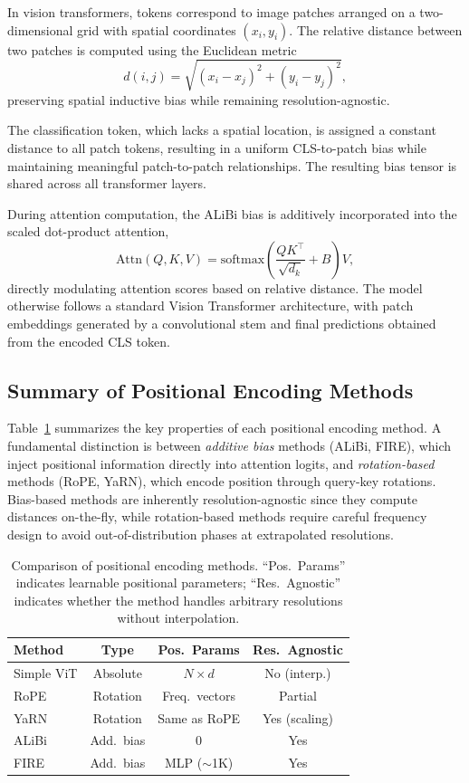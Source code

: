 In vision transformers, tokens correspond to image patches arranged on a two-dimensional grid with spatial coordinates $(x_i, y_i)$. The relative distance between two patches is computed using the Euclidean metric
\[
d(i, j) = \sqrt{(x_i - x_j)^2 + (y_i - y_j)^2},
\]
preserving spatial inductive bias while remaining resolution-agnostic.

The classification token, which lacks a spatial location, is assigned a constant distance to all patch tokens, resulting in a uniform CLS-to-patch bias while maintaining meaningful patch-to-patch relationships. The resulting bias tensor is shared across all transformer layers.

During attention computation, the ALiBi bias is additively incorporated into the scaled dot-product attention,
\[
\text{Attn}(Q, K, V) =
\text{softmax}\left(\frac{QK^\top}{\sqrt{d_k}} + B\right)V,
\]
directly modulating attention scores based on relative distance. The model otherwise follows a standard Vision Transformer architecture, with patch embeddings generated by a convolutional stem and final predictions obtained from the encoded CLS token.

\subsection{Summary of Positional Encoding Methods}

Table~\ref{tab:method_comparison} summarizes the key properties of each positional encoding method. A fundamental distinction is between \emph{additive bias} methods (ALiBi, FIRE), which inject positional information directly into attention logits, and \emph{rotation-based} methods (RoPE, YaRN), which encode position through query-key rotations. Bias-based methods are inherently resolution-agnostic since they compute distances on-the-fly, while rotation-based methods require careful frequency design to avoid out-of-distribution phases at extrapolated resolutions.

\begin{table}[t]
\centering
\caption{Comparison of positional encoding methods. ``Pos.\ Params'' indicates learnable positional parameters; ``Res.\ Agnostic'' indicates whether the method handles arbitrary resolutions without interpolation.}
\label{tab:method_comparison}
\small
\begin{tabular}{lccc}
\toprule
\textbf{Method} & \textbf{Type} & \textbf{Pos.\ Params} & \textbf{Res.\ Agnostic} \\
\midrule
Simple ViT & Absolute & $N \times d$ & No (interp.) \\
RoPE & Rotation & Freq.\ vectors & Partial \\
YaRN & Rotation & Same as RoPE & Yes (scaling) \\
ALiBi & Add.\ bias & 0 & Yes \\
FIRE & Add.\ bias & MLP ($\sim$1K) & Yes \\
\bottomrule
\end{tabular}
\end{table}



